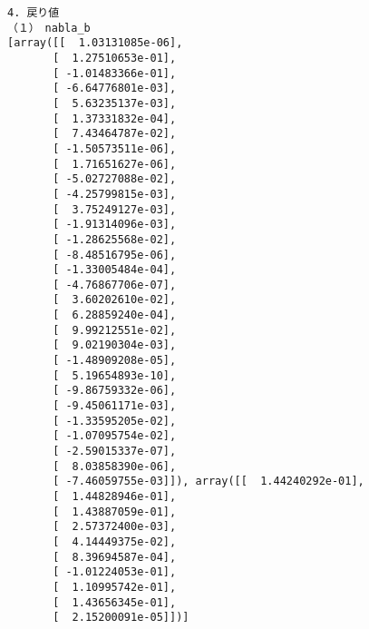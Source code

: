 \documentclass[11pt,a4j,fleqn]{jarticle}
\begin{document}
\begin{verbatim}
4. 戻り値
（１）　nabla_b
[array([[  1.03131085e-06],
       [  1.27510653e-01],
       [ -1.01483366e-01],
       [ -6.64776801e-03],
       [  5.63235137e-03],
       [  1.37331832e-04],
       [  7.43464787e-02],
       [ -1.50573511e-06],
       [  1.71651627e-06],
       [ -5.02727088e-02],
       [ -4.25799815e-03],
       [  3.75249127e-03],
       [ -1.91314096e-03],
       [ -1.28625568e-02],
       [ -8.48516795e-06],
       [ -1.33005484e-04],
       [ -4.76867706e-07],
       [  3.60202610e-02],
       [  6.28859240e-04],
       [  9.99212551e-02],
       [  9.02190304e-03],
       [ -1.48909208e-05],
       [  5.19654893e-10],
       [ -9.86759332e-06],
       [ -9.45061171e-03],
       [ -1.33595205e-02],
       [ -1.07095754e-02],
       [ -2.59015337e-07],
       [  8.03858390e-06],
       [ -7.46059755e-03]]), array([[  1.44240292e-01],
       [  1.44828946e-01],
       [  1.43887059e-01],
       [  2.57372400e-03],
       [  4.14449375e-02],
       [  8.39694587e-04],
       [ -1.01224053e-01],
       [  1.10995742e-01],
       [  1.43656345e-01],
       [  2.15200091e-05]])]


\end{verbatim}
\end{document}
